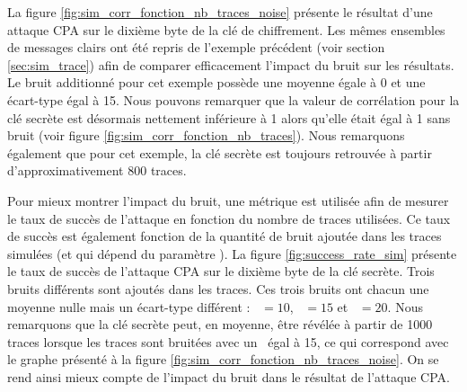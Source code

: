 \documentclass[oneside]{book}
\begin{document}
\hspace{-0.5cm}La figure \ref{fig:sim_corr_fonction_nb_traces_noise} présente le résultat d'une attaque CPA sur le dixième byte de la clé de chiffrement. Les mêmes ensembles de messages clairs ont été repris de l'exemple précédent (voir section \ref{sec:sim_trace}) afin de comparer efficacement l'impact du bruit sur les résultats. Le bruit additionné pour cet exemple possède une moyenne égale à 0 et une écart-type égal à 15. Nous pouvons remarquer que la valeur de corrélation pour la clé secrète est désormais nettement inférieure à 1 alors qu'elle était égal à 1 sans bruit (voir figure \ref{fig:sim_corr_fonction_nb_traces}). Nous remarquons également que pour cet exemple, la clé secrète est toujours retrouvée à partir d'approximativement 800 traces.

\hspace{-0.5cm}Pour mieux montrer l'impact du bruit, une métrique est utilisée afin de mesurer le taux de succès de l'attaque en fonction du nombre de traces utilisées. Ce taux de succès est également fonction de la quantité de bruit ajoutée dans les traces simulées (et qui dépend du paramètre \sigma). La figure \ref{fig:success_rate_sim} présente le taux de succès de l'attaque CPA sur le dixième byte de la clé secrète. Trois bruits différents sont ajoutés dans les traces. Ces trois bruits ont chacun une moyenne nulle mais un écart-type différent : \sigma \ $= 10$, \sigma \ $= 15$ et \sigma \ $= 20$. Nous remarquons que la clé secrète peut, en moyenne, être révélée à partir de 1000 traces lorsque les traces sont bruitées avec un \sigma \ égal à 15, ce qui correspond avec le graphe présenté à la figure \ref{fig:sim_corr_fonction_nb_traces_noise}. On se rend ainsi mieux compte de l'impact du bruit dans le résultat de l'attaque CPA. 
\end{document}
